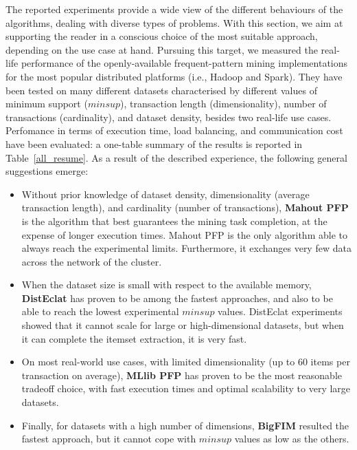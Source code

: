 The reported experiments provide a wide view of the different behaviours of the
algorithms, dealing with diverse types of problems.
With this section, we aim at supporting the reader
in a conscious choice of the most suitable approach,
depending on the use case at hand.
Pursuing this target, we measured the real-life performance
of the openly-available frequent-pattern mining implementations
for the most popular distributed platforms (i.e., Hadoop and Spark).
They have been tested on many different datasets
characterised by different values of
minimum support ($minsup$),
transaction length (dimensionality),
number of transactions (cardinality),
and dataset density,
besides two real-life use cases.
Perfomance in terms of execution time, load balancing, and communication cost
have been evaluated:
a one-table summary of the results is reported in Table~\ref{all_resume}.
As a result of the described experience,
the following general suggestions emerge:

\begin{itemize}
 \item
 Without prior knowledge of dataset density, dimensionality
 (average transaction length), and cardinality (number of transactions),
 \textbf{Mahout PFP} is the algorithm that best guarantees
 the mining task completion,
 at the expense of longer execution times.
 Mahout PFP is the only algorithm able to always reach the experimental limits.
 Furthermore, it exchanges very few data across the network of the cluster.
 \item
 When the dataset size is small with respect to the available memory,
 \textbf{DistEclat} has proven to be among the fastest approaches,
 and also to be able to reach the lowest experimental $minsup$ values.
 DistEclat experiments showed that it cannot scale for large or
 high-dimensional datasets, but when it can complete the itemset extraction,
 it is very fast.
 \item
 On most real-world use cases, with limited dimensionality
 (up to 60 items per transaction on average), \textbf{MLlib PFP}
 has proven to be the most reasonable tradeoff choice,
 with fast execution times and optimal scalability to very large datasets.
 \item
 Finally, for datasets with a high number of dimensions, \textbf{BigFIM} resulted
 the fastest approach,
 but it cannot cope with $minsup$ values as low as the others.
\end{itemize}

